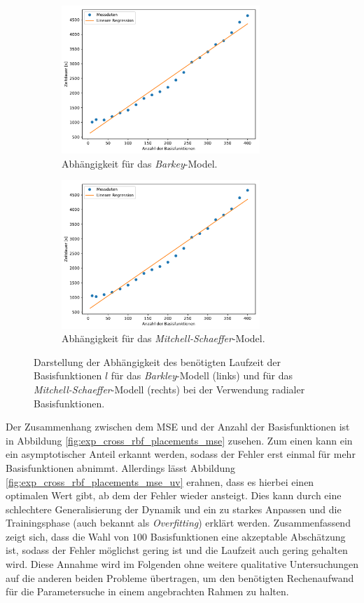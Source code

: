 \begin{figure}[h]
	\centering
	\begin{subfigure}{.5\textwidth}
		\centering
		\includegraphics[height=2.2in]{figures/results/cross_prediction/rbf_placements_uv_time.pdf}
		\setcapmargin[1cm]{1cm}
		\caption{Abhängigkeit für das \textit{Barkey}-Model.}
		\label{fig:exp_cross_rbf_placements_time_uv}
	\end{subfigure}%
	\begin{subfigure}{.5\textwidth}
		\centering
		\includegraphics[height=2.2in]{figures/results/cross_prediction/rbf_placements_vh_time.pdf}
		\setcapmargin[1cm]{1cm}
		\caption{Abhängigkeit für das \textit{Mitchell-Schaeffer}-Model.}
		\label{fig:exp_cross_rbf_placements_time_vh}
	\end{subfigure}
	\caption{Darstellung der Abhängigkeit des benötigten Laufzeit der Basisfunktionen $l$ für das \textit{Barkley}-Modell (links) und für das \textit{Mitchell-Schaeffer}-Modell (rechts) bei der Verwendung radialer Basisfunktionen.}
	\label{fig:exp_cross_rbf_placements_time}
\end{figure}

Der Zusammenhang zwischen dem MSE und der Anzahl der Basisfunktionen ist in Abbildung \ref{fig:exp_cross_rbf_placements_mse} zusehen. Zum einen kann ein ein asymptotischer Anteil erkannt werden, sodass der Fehler erst einmal für mehr Basisfunktionen abnimmt. Allerdings lässt Abbildung \ref{fig:exp_cross_rbf_placements_mse_uv} erahnen, dass es hierbei einen optimalen Wert gibt, ab dem der Fehler wieder ansteigt. Dies kann durch eine schlechtere Generalisierung der Dynamik und ein zu starkes Anpassen und die Trainingsphase (auch bekannt als \textit{Overfitting}) erklärt werden. Zusammenfassend zeigt sich, dass die Wahl von $100$ Basisfunktionen eine akzeptable Abschätzung ist, sodass der Fehler möglichst gering ist und die Laufzeit auch gering gehalten wird. Diese Annahme wird im Folgenden ohne weitere qualitative Untersuchungen auf die anderen beiden Probleme übertragen, um den benötigten Rechenaufwand für die Parametersuche in einem angebrachten Rahmen zu halten.  

